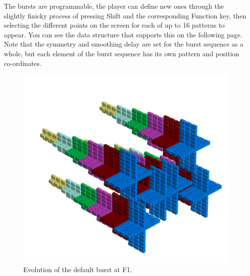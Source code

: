 The bursts are programmable, the player can define new ones through the slightly finicky process of pressing
Shift and the corresponding Function key, then selecting the different points on the screen for each of up
to 16 patterns to appear. You can see the data structure that supports this on the following page. Note
that the symmetry and smoothing delay are set for the burst sequence as a whole, but each element of the
burst sequence has its own pattern and position co-ordinates.

\clearpage
\begin{figure}[H]
    \centering
    \begin{adjustbox}{width=12cm,center}
      \includegraphics[width=12cm]{src/patterns/bursts/pattern0-45.png}%
    \end{adjustbox}
\caption{Evolution of the default burst at F1.}
\end{figure}
\clearpage

